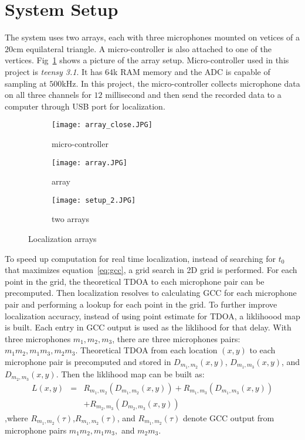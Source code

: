 \section{System Setup}
The system uses two arrays, each with three microphones mounted on vetices of a $20$cm equilateral triangle. A micro-controller is also attached to one of the vertices. Fig~\ref{fig:setup_array} shows a picture of the array setup. Micro-controller used in this project is \emph{teensy 3.1}. It has $64$k RAM memory and the ADC is capable of sampling at $500$kHz. In this project, the micro-controller collects microphone data on all three channels for $12$ millisecond and then send the recorded data to a computer through USB port for localization. 

\begin{figure}[]
  \centering
  \begin{subfigure}[]{.15\textwidth}
    \texttt{[image: array\_close.JPG]}
    \caption{micro-controller}
  \end{subfigure}
  \begin{subfigure}[]{.15\textwidth}
    \texttt{[image: array.JPG]}
    \caption{array}
  \end{subfigure}
  \begin{subfigure}[]{.15\textwidth}
    \texttt{[image: setup\_2.JPG]}
    \caption{two arrays}
  \end{subfigure}
  \caption{Localization arrays}
  \label{fig:setup_array}
\end{figure}

To speed up computation for real time localization, instead of searching for $t_0$ that maximizes equation~\ref{eq:gcc}, a grid search in 2D grid is performed. For each point in the grid, the theoretical TDOA to each microphone pair can be precomputed. Then localization resolves to calculating GCC for each microphone pair and performing a lookup for each point in the grid. To further improve localization accuracy, instead of using point estimate for TDOA, a liklihoood map is built. Each entry in GCC output is used as the liklihood for that delay. With three microphones $m_1,m_2,m_3$, there are three microphones pairs: $m_1m_2,m_1m_3,m_2m_3$. Theoretical TDOA from each location $(x,y)$ to each microphone pair is precomputed and stored in $D_{m_1,m_2}(x,y)$, $D_{m_1,m_3}(x,y)$, and $D_{m_2,m_3}(x,y)$. Then the liklihood map can be built as:
\begin{eqnarray*}
  L(x,y) &=& R_{m_1,m_2}(D_{m_1,m_2}(x,y)) + R_{m_1,m_3}(D_{m_1,m_3}(x,y)) \\
 & & +R_{m_2,m_3}(D_{m_2,m_3}(x,y)) 
\end{eqnarray*}
,where $R_{m_1,m_2}(\tau)$,$R_{m_1,m_2}(\tau)$, and $R_{m_1,m_2}(\tau)$ denote GCC output from microphone pairs $m_1m_2,m_1m_3,$ and $m_2m_3$.

